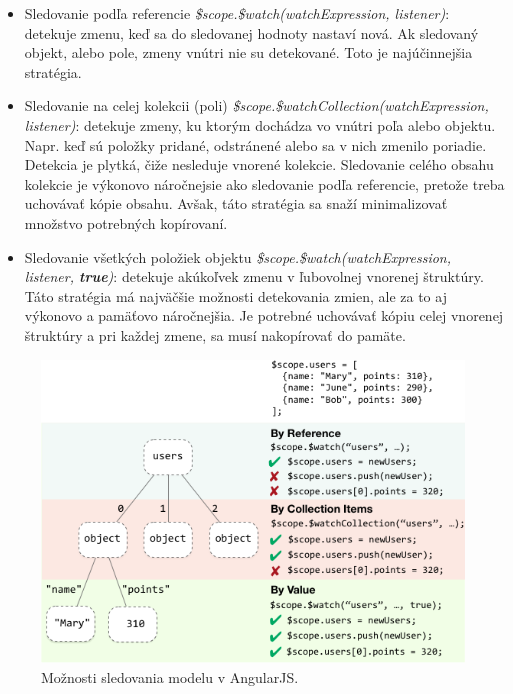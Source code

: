 \begin{itemize}
  \item Sledovanie podľa referencie \textit{\$scope.\$watch(watchExpression, listener)}: detekuje zmenu, keď sa do sledovanej hodnoty nastaví nová. Ak sledovaný objekt, alebo pole, zmeny vnútri nie su detekované. Toto je najúčinnejšia stratégia.
  \item Sledovanie na celej kolekcii (poli) \textit{\$scope.\$watchCollection(watchExpression, listener)}: detekuje zmeny, ku ktorým dochádza vo vnútri poľa alebo objektu. Napr. keď sú položky pridané, odstránené alebo sa v nich zmenilo poriadie. Detekcia je plytká, čiže nesleduje vnorené kolekcie. Sledovanie celého obsahu kolekcie je výkonovo náročnejsie ako sledovanie podľa referencie, pretože treba uchovávať kópie obsahu. Avšak, táto stratégia sa snaží minimalizovať množstvo potrebných kopírovaní.
  \item Sledovanie všetkých položiek objektu \textit{\$scope.\$watch(watchExpression, listener, \textbf{true})}: detekuje akúkoľvek zmenu v ľubovolnej vnorenej štruktúry. Táto stratégia má najväčšie možnosti detekovania zmien, ale za to aj výkonovo a pamäťovo náročnejšia. Je potrebné uchovávať kópiu celej vnorenej štruktúry a pri každej zmene, sa musí nakopírovať do pamäte.
\end{itemize}

\begin{figure}[H]
  \centering
  \includegraphics[scale=0.7]{img/angular/concepts-scope-watch-strategies.png}
  \caption{Možnosti sledovania modelu v AngularJS.}
  \label{img-real-vs-vl}
\end{figure}

